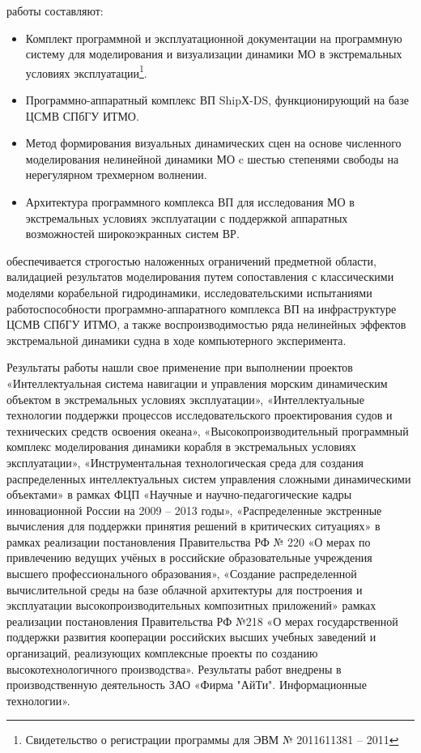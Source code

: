  работы составляют:
\begin{itemize}
\item	Комплект программной и эксплуатационной документации на программную систему для моделирования и визуализации динамики МО в экстремальных условиях эксплуатации\footnote{Свидетельство о регистрации программы для ЭВМ № 2011611381 – 2011}.
\item	Программно-аппаратный комплекс ВП ShipХ-DS, функционирующий на базе ЦСМВ СПбГУ ИТМО.
\end{itemize}



\begin{itemize}
\item	Метод формирования визуальных динамических сцен на основе численного моделирования нелинейной динамики МО c шестью степенями свободы на нерегулярном трехмерном волнении.
\item	Архитектура программного комплекса ВП для исследования МО в экстремальных условиях эксплуатации с поддержкой аппаратных возможностей широкоэкранных систем ВР.
\end{itemize}


 обеспечивается строгостью наложенных ограничений предметной области, валидацией результатов моделирования путем сопоставления с классическими моделями корабельной гидродинамики, исследовательскими испытаниями работоспособности программно-аппаратного комплекса ВП на инфраструктуре ЦСМВ СПбГУ ИТМО, а также воспроизводимостью ряда нелинейных эффектов экстремальной динамики судна в ходе компьютерного эксперимента.

 Результаты работы нашли свое применение при выполнении проектов «Интеллектуальная система навигации и управления морским динамическим объектом в экстремальных условиях эксплуатации», «Интеллектуальные технологии поддержки процессов исследовательского проектирования судов и технических средств освоения океана», «Высокопроизводительный программный комплекс моделирования динамики корабля в экстремальных условиях эксплуатации», «Инструментальная технологическая среда для создания распределенных интеллектуальных систем управления сложными динамическими объектами» в рамках ФЦП «Научные и научно-педагогические кадры инновационной России на 2009 – 2013 годы», «Распределенные экстренные вычисления для поддержки принятия решений в критических ситуациях» в рамках реализации постановления Правительства РФ № 220 «О мерах по привлечению ведущих учёных в российские образовательные учреждения высшего профессионального образования», «Создание распределенной вычислительной среды на базе облачной архитектуры для построения и эксплуатации высокопроизводительных композитных приложений» рамках реализации постановления Правительства РФ №218 «О мерах государственной поддержки развития кооперации российских высших учебных заведений и организаций, реализующих комплексные проекты по созданию высокотехнологичного производства».  Результаты работ внедрены в производственную деятельность ЗАО «Фирма "АйТи". Информационные технологии».

